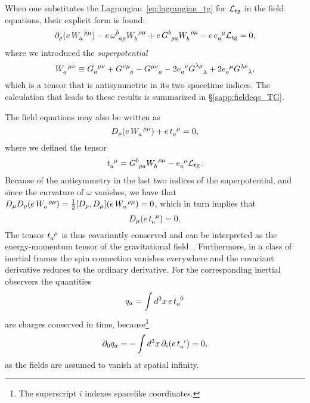 \documentclass[
final,
11pt,
a4paper,
DIV=11,
headinclude=true,
footinclude=false,
bibliography=totoc,
twoside=true,  %
BCOR=5mm
]{scrbook}
\begin{document}
When one substitutes the Lagrangian~\eqref{eq:lagrangian_tg} for 
$\mathcal{L}_\mathrm{tg}$ in the field equations, their explicit form is 
found:
\begin{equation}
\label{eq:fieldEqsTG_expl}
  \pd_\rho (e\, W\ind{_a^{\rho\mu}}) - e\, \omega\ind{^b_{a\rho}} 
  W\ind{_b^{\rho\mu}} + e\, G\ind{^b_{\rho a}} W\ind{_b^{\rho\mu}} 
  - e\, e\ind{_a^\mu} \mathcal{L}_\mrm{tg} = 0,
\end{equation}
where we introduced the \emph{superpotential}
\begin{equation}
\label{eq:defW_G}
  W\ind{_a^{\mu\nu}} \equiv G\ind{_a^{\mu\nu}} 
  + G\ind{^{\nu\mu}_a} - G\ind{^{\mu\nu}_a} - 2e\ind{_a^\nu} 
  G\ind{^{\lambda\mu}_\lambda} + 2e\ind{_a^\mu} 
  G\ind{^{\lambda\nu}_\lambda},
\end{equation}
which is a tensor that is antisymmetric in its two spacetime 
indices.  The calculation that leads to these results is 
summarized in \S\ref{sapp:fieldeqs_TG}.

The field equations may also be written as
\begin{equation*}
  D_\rho (e\, W\ind{_a^{\rho\mu}}) + e\, t\ind{_a^\mu} = 0,
\end{equation*}
where we defined the tensor
\begin{equation}
\label{eq:EM_tensor_grav_tg}
  t\ind{_a^\mu} = G\ind{^b_{\rho a}} W\ind{_b^{\rho\mu}} 
  - e\ind{_a^\mu} \mathcal{L}_\mrm{tg}.
\end{equation}
Because of the antisymmetry in the last two indices of the 
superpotential, and since the curvature of $\omega$ vanishes, we 
have that $D_\mu D_\rho (e\, W\ind{_a^{\rho\mu}}) = \tfrac{1}{2} 
[D_\rho, D_\mu](e\, W\ind{_a^{\rho\mu}}) = 0$, which in turn 
implies that
\begin{equation}
  D_\mu (e\, t\ind{_a^\mu}) = 0.
\end{equation}
The tensor $t\ind{_a^\mu}$ is thus covariantly conserved and can 
be interpreted as the energy-momentum tensor of the gravitational 
field~\cite{deAndrade:2000kr}. Furthermore, in a class of 
inertial frames the spin connection vanishes everywhere and the 
covariant derivative reduces to the ordinary derivative. For the 
corresponding inertial observers the quantities%
\begin{equation}
\label{eq:cons_charges_TG}
  q_a = \int d^3x\, e\, t\ind{_a^0}
\end{equation}
are charges conserved in time, because\footnote{The superscript 
  $i$ indexes spacelike coordinates.}
\begin{equation*}
  \pd_0 q_a = - \int d^3x\, \pd_i( e\, t\ind{_a^i}) = 0,
\end{equation*}
as the fields are assumed to vanish at spatial infinity.
\end{document}
